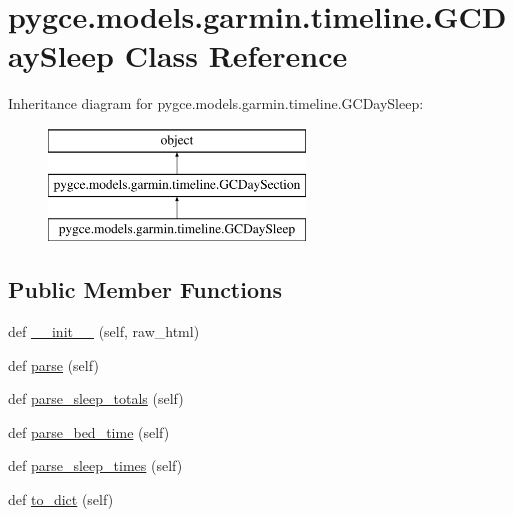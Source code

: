 \hypertarget{classpygce_1_1models_1_1garmin_1_1timeline_1_1_g_c_day_sleep}{}\section{pygce.\+models.\+garmin.\+timeline.\+G\+C\+Day\+Sleep Class Reference}
\label{classpygce_1_1models_1_1garmin_1_1timeline_1_1_g_c_day_sleep}
Inheritance diagram for pygce.\+models.\+garmin.\+timeline.\+G\+C\+Day\+Sleep\+:\begin{figure}[H]
\begin{center}
\leavevmode
\includegraphics[height=3.000000cm]{classpygce_1_1models_1_1garmin_1_1timeline_1_1_g_c_day_sleep}
\end{center}
\end{figure}
\subsection*{Public Member Functions}
\begin{DoxyCompactItemize}
\item 
def \hyperlink{classpygce_1_1models_1_1garmin_1_1timeline_1_1_g_c_day_sleep_a58d1e0c8797955f8d88f1e662dc9ec76}{\+\_\+\+\_\+init\+\_\+\+\_\+} (self, raw\+\_\+html)
\item 
def \hyperlink{classpygce_1_1models_1_1garmin_1_1timeline_1_1_g_c_day_sleep_ad2906beca69f2678a5fb5fc619136039}{parse} (self)
\item 
def \hyperlink{classpygce_1_1models_1_1garmin_1_1timeline_1_1_g_c_day_sleep_aca0d551806aeaaaa7ca5ab55176a1677}{parse\+\_\+sleep\+\_\+totals} (self)
\item 
def \hyperlink{classpygce_1_1models_1_1garmin_1_1timeline_1_1_g_c_day_sleep_a1450b6f36eb2950df8d7b339191e0ac8}{parse\+\_\+bed\+\_\+time} (self)
\item 
def \hyperlink{classpygce_1_1models_1_1garmin_1_1timeline_1_1_g_c_day_sleep_af278bd0696f47ce317fb5e356fc6a438}{parse\+\_\+sleep\+\_\+times} (self)
\item 
def \hyperlink{classpygce_1_1models_1_1garmin_1_1timeline_1_1_g_c_day_sleep_a7ab65a28040de4131099b0479917eb75}{to\+\_\+dict} (self)
\end{DoxyCompactItemize}
